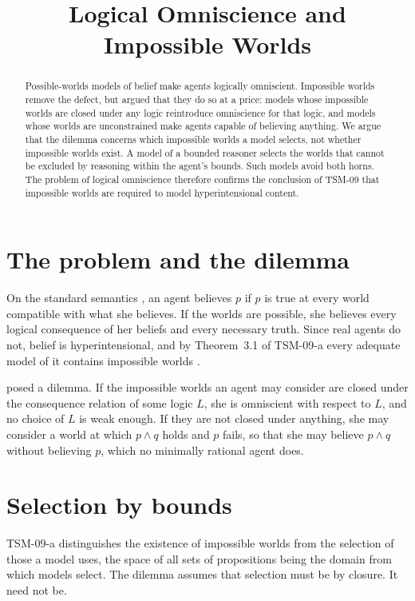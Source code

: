 \documentclass{situationist-preprint}
\title{Logical Omniscience and Impossible Worlds}
\begin{document}
\maketitle

\begin{abstract}
Possible-worlds models of belief make agents logically omniscient. Impossible worlds remove the defect, but \citet{Bjerring2013} argued that they do so at a price: models whose impossible worlds are closed under any logic reintroduce omniscience for that logic, and models whose worlds are unconstrained make agents capable of believing anything. We argue that the dilemma concerns which impossible worlds a model selects, not whether impossible worlds exist. A model of a bounded reasoner selects the worlds that cannot be excluded by reasoning within the agent's bounds. Such models avoid both horns. The problem of logical omniscience therefore confirms the conclusion of TSM-09 that impossible worlds are required to model hyperintensional content.
\end{abstract}

\section{The problem and the dilemma}

On the standard semantics \citep{Hintikka1962}, an agent believes $p$ if $p$ is true at every world compatible with what she believes. If the worlds are possible, she believes every logical consequence of her beliefs and every necessary truth. Since real agents do not, belief is hyperintensional, and by Theorem~3.1 of TSM-09-a every adequate model of it contains impossible worlds \citep{Hintikka1975,Rantala1982}.

\citet{Bjerring2013} posed a dilemma. If the impossible worlds an agent may consider are closed under the consequence relation of some logic $L$, she is omniscient with respect to $L$, and no choice of $L$ is weak enough. If they are not closed under anything, she may consider a world at which $p \wedge q$ holds and $p$ fails, so that she may believe $p \wedge q$ without believing $p$, which no minimally rational agent does.

\section{Selection by bounds}

TSM-09-a distinguishes the existence of impossible worlds from the selection of those a model uses, the space of all sets of propositions being the domain from which models select. The dilemma assumes that selection must be by closure. It need not be.
\end{document}
